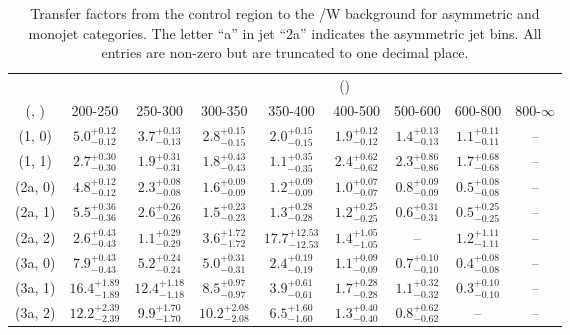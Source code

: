 \begin{table}[h!]
\tiny
\centering
\caption{Transfer factors from the \mmj control region to the \ttbar/W background for asymmetric and monojet categories. The letter ``a'' in jet \eg ``2a''  indicates the asymmetric jet bins. All entries are non-zero but are truncated to one decimal place.\label{tab:tf_ttw_mumu_asym}}
\begin{tabular}
{ccccccccc}
	\hline\hline
&	& \multicolumn{8}{c}{\scalht (\gev)} \\ 
	 (\njet,  \nb) & 200-250 & 250-300 & 300-350 & 350-400 & 400-500 & 500-600 & 600-800 & 800-$\infty$ \\ [0.8ex] 
\hline
	(1, 0) & $5.0^{+ 0.12 }_{- 0.12 }$ & $3.7^{+ 0.13 }_{- 0.13 }$ & $2.8^{+ 0.15 }_{- 0.15 }$ & $2.0^{+ 0.15 }_{- 0.15 }$ & $1.9^{+ 0.12 }_{- 0.12 }$ & $1.4^{+ 0.13 }_{- 0.13 }$ & $1.1^{+ 0.11 }_{- 0.11 }$ & -- \\[0.5ex] 
	(1, 1) & $2.7^{+ 0.30 }_{- 0.30 }$ & $1.9^{+ 0.31 }_{- 0.31 }$ & $1.8^{+ 0.43 }_{- 0.43 }$ & $1.1^{+ 0.35 }_{- 0.35 }$ & $2.4^{+ 0.62 }_{- 0.62 }$ & $2.3^{+ 0.86 }_{- 0.86 }$ & $1.7^{+ 0.68 }_{- 0.68 }$ & -- \\[0.5ex] 
	(2a, 0) & $4.8^{+ 0.12 }_{- 0.12 }$ & $2.3^{+ 0.08 }_{- 0.08 }$ & $1.6^{+ 0.09 }_{- 0.09 }$ & $1.2^{+ 0.09 }_{- 0.09 }$ & $1.0^{+ 0.07 }_{- 0.07 }$ & $0.8^{+ 0.09 }_{- 0.09 }$ & $0.5^{+ 0.08 }_{- 0.08 }$ & -- \\[0.5ex] 
	(2a, 1) & $5.5^{+ 0.36 }_{- 0.36 }$ & $2.6^{+ 0.26 }_{- 0.26 }$ & $1.5^{+ 0.23 }_{- 0.23 }$ & $1.3^{+ 0.28 }_{- 0.28 }$ & $1.2^{+ 0.25 }_{- 0.25 }$ & $0.6^{+ 0.31 }_{- 0.31 }$ & $0.5^{+ 0.25 }_{- 0.25 }$ & -- \\[0.5ex] 
	(2a, 2) & $2.6^{+ 0.43 }_{- 0.43 }$ & $1.1^{+ 0.29 }_{- 0.29 }$ & $3.6^{+ 1.72 }_{- 1.72 }$ & $17.7^{+ 12.53 }_{- 12.53 }$ & $1.4^{+ 1.05 }_{- 1.05 }$ & -- & $1.2^{+ 1.11 }_{- 1.11 }$ & -- \\[0.5ex] 
	(3a, 0) & $7.9^{+ 0.43 }_{- 0.43 }$ & $5.2^{+ 0.24 }_{- 0.24 }$ & $5.0^{+ 0.31 }_{- 0.31 }$ & $2.4^{+ 0.19 }_{- 0.19 }$ & $1.1^{+ 0.09 }_{- 0.09 }$ & $0.7^{+ 0.10 }_{- 0.10 }$ & $0.4^{+ 0.08 }_{- 0.08 }$ & -- \\[0.5ex] 
	(3a, 1) & $16.4^{+ 1.89 }_{- 1.89 }$ & $12.4^{+ 1.18 }_{- 1.18 }$ & $8.5^{+ 0.97 }_{- 0.97 }$ & $3.9^{+ 0.61 }_{- 0.61 }$ & $1.7^{+ 0.28 }_{- 0.28 }$ & $1.1^{+ 0.32 }_{- 0.32 }$ & $0.3^{+ 0.10 }_{- 0.10 }$ & -- \\[0.5ex] 
	(3a, 2) & $12.2^{+ 2.39 }_{- 2.39 }$ & $9.9^{+ 1.70 }_{- 1.70 }$ & $10.2^{+ 2.08 }_{- 2.08 }$ & $6.5^{+ 1.60 }_{- 1.60 }$ & $1.3^{+ 0.40 }_{- 0.40 }$ & $0.8^{+ 0.62 }_{- 0.62 }$ & -- & -- \\[0.5ex] 

\end{tabular}
\end{table}
